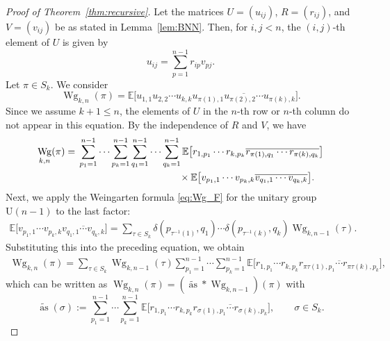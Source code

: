\documentclass[pdftex]{sigma}
\numberwithin{equation}{section}
\theoremstyle{definition}
\newcommand{\UU}{\mathrm{U}}
\DeclareMathOperator{\Raise}{as}
\DeclareMathOperator{\Wg}{Wg}
\begin{document}
\begin{proof}[Proof of Theorem~\ref{thm:recursive}]
 Let the matrices $U=(u_{ij})$, $R=(r_{ij})$, and $V=(v_{ij})$ be as stated in Lemma~\ref{lem:BNN}.
 Then, for $i,j <n$, the $(i,j)$-th element of $U$ is given by
 \[
 u_{ij} = \sum_{p=1}^{n-1} r_{ip} v_{p j}.
 \]
 Let $\pi \in S_k$. We consider
 \[
 \Wg_{k,n}(\pi) = \mathbb{E}\bigl[ u_{1,1} u_{2,2} \cdots u_{k,k}
 \overline{u_{\pi(1),1} u_{\pi(2),2} \cdots u_{\pi(k),k}}\bigr].
 \]
 Since we assume $k+1 \le n$, the elements of $U$ in the $n$-th row or $n$-th column do not appear in this equation.
 By the independence of $R$ and $V$, we have
 \begin{align*}
 \Wg_{k,n}(\pi)
={}& \sum_{p_1=1}^{n-1} \cdots \sum_{p_k=1}^{n-1} \sum_{q_1=1}^{n-1} \cdots \sum_{q_k=1}^{n-1}
 \mathbb{E}\bigl[ r_{1, p_1} \cdots r_{k, p_k} \overline{r_{\pi(1),q_1} \cdots r_{\pi(k), q_k}}\bigr] \\
 & \hphantom{\sum_{p_1=1}^{n-1} \cdots \sum_{p_k=1}^{n-1} \sum_{q_1=1}^{n-1} \cdots \sum_{q_k=1}^{n-1}}{}
 \times \mathbb{E} \bigl[ v_{p_1, 1} \cdots v_{p_k, k} \overline{ v_{q_1, 1} \cdots v_{q_k, k} } \bigr].
 \end{align*}
 Next, we apply the Weingarten formula \eqref{eq:Wg_F} for the unitary group $\UU(n-1)$ to the last factor:
 \begin{align*}
 \mathbb{E} \bigl[ v_{p_1, 1} \cdots v_{p_k, k} \overline{ v_{q_1, 1} \cdots v_{q_k, k} } \bigr]
 = \sum_{\tau \in S_k} \delta(p_{\tau^{-1}(1)},q_1) \cdots \delta(p_{\tau^{-1}(k)},q_k) \Wg_{k,n-1}(\tau).
 \end{align*}
 Substituting this into the preceding equation, we obtain
 \begin{align*}
 \Wg_{k,n}(\pi)
 = \sum_{\tau \in S_k} \Wg_{k,n-1}(\tau) \sum_{p_1=1}^{n-1} \cdots \sum_{p_k=1}^{n-1}
 \mathbb{E} \bigl[ r_{1,p_1} \cdots r_{k,p_k}
 \overline{r_{\pi\tau(1),p_1} \cdots r_{\pi\tau(k),p_k}} \bigr],
 \end{align*}
which can be written as $\Wg_{k,n} (\pi)= (\widetilde{\Raise} * \Wg_{k,n-1})(\pi)$ with
\[
\widetilde{\Raise}(\sigma) := \sum_{p_1=1}^{n-1} \cdots \sum_{p_k=1}^{n-1}
\mathbb{E} \bigl[ r_{1,p_1} \cdots r_{k,p_k}
\overline{r_{\sigma(1),p_1} \cdots r_{\sigma(k),p_{k}}}\bigr], \qquad \sigma \in S_k.
\]


\end{proof}
\end{document}
